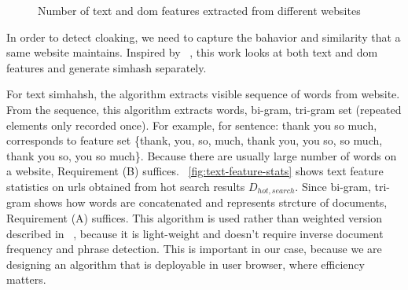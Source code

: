 \begin{figure}[t]
  \centering
\caption{Number of text and dom features extracted from different websites}
\end{figure}

In order to detect cloaking, we need to capture the bahavior and similarity that
a same website maintains. Inspired by ~\cite{wang2011cloak}, this work looks at
both text and dom features and generate simhash separately.

For text simhahsh, the algorithm extracts visible sequence of words from website.
From the sequence, this algorithm extracts words, bi-gram, tri-gram set
(repeated elements only recorded once). For example, for
sentence: thank you so much, corresponds to feature set \{thank, you, so, much,
thank you, you so, so much, thank you so, you so much\}.
Because there are usually large number of words on a website, Requirement (B)
suffices. ~\autoref{fig:text-feature-stats} shows text feature statistics on %
urls obtained from hot search results $D_{hot, search}$. Since bi-gram, tri-gram 
shows how words are concatenated and represents strcture of documents,
Requirement (A) suffices. This algorithm is used rather than weighted version
described in  ~\cite{manku2007detecting}, because it is light-weight and doesn't
require inverse document frequency and phrase detection. This is important
in our case, because we are designing an algorithm that is deployable in user
browser, where efficiency matters.

